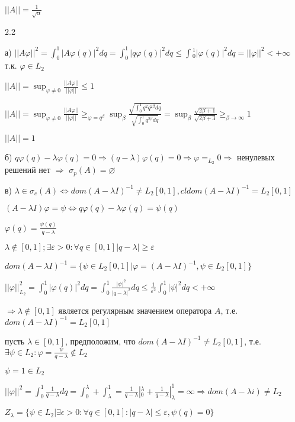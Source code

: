 \documentclass[russian]{article}
\begin{document}
$ ||A|| = \frac{1}{\sqrt{\alpha}} $

2.2

а) $ ||A\varphi||^2=\int_0^1|A\varphi(q)|^2dq=\int_{0}^{1}|q\varphi(q)|^2dq \le \int{}_{0}^{1}|\varphi (q)|^2dq =|| \varphi ||^2<+\infty$ т.к. $\varphi \in L_2 $

$ ||A|| = \sup _{\varphi \ne 0 } \frac{||A\varphi||}{||\varphi||} \le 1 $ 

$ ||A|| = \sup _{\varphi \ne 0 } \frac{||A\varphi||}{||\varphi||} \ge _{\varphi=q^\beta} \sup_\beta \frac{\sqrt{\int_0^1q^2q^{2\beta}dq}}{\sqrt{\int_0^1q^{2\beta}dq}} = \sup _\beta \frac{\sqrt{2\beta + 1}}{\sqrt{2\beta+3}} \ge _{\beta \rightarrow \infty} 1$

$ ||A|| = 1 $

б) $q\varphi(q)-\lambda\varphi(q)=0\Rightarrow(q-\lambda)\varphi(q)=0\Rightarrow\varphi=_{L_{2}}0 \Rightarrow $ ненулевых решений нет $\Rightarrow$ $\sigma_{p}(A)=\varnothing$

в) $ \lambda \in \sigma_c(A) \Leftrightarrow dom (A - \lambda I)^{-1} \ne L_2[0,1], cl dom (A - \lambda I) ^ {-1} = L_2 [0,1]$

$(A-\lambda I)\varphi=\psi\Leftrightarrow q\varphi(q)-\lambda\varphi(q)=\psi(q)$

$\varphi(q)=\frac{\psi(q)}{q-\lambda}$

$ \lambda \notin [0, 1]; \exists \varepsilon > 0 : \forall q \in [0,1] |q-\lambda|\ge \varepsilon $

$ dom(A-\lambda I)^{-1}=\{\psi\in L_2[0,1]|\varphi=(A-\lambda I)^{-1},\psi \in L_2[0,1]\}$

$ ||\varphi||^2_{L_2} = \int_0^1|\varphi(q)|^2dq=\int_0^1\frac{|\psi|^2}{|q-\lambda|^2}dq \le \frac{1}{\varepsilon^2}\int_0^1|\psi|^2dq < +\infty$

$ \Rightarrow \lambda \notin [0,1] $ является регулярным значением оператора $A$, т.е. $dom(A-\lambda I)^{-1}=L_2[0,1]$

пусть $ \lambda \in [0,1]$, предположим, что $dom(A-\lambda I)^{-1}\ne L_2[0,1]$, т.е. $\exists \psi \in L_2 : \varphi = \frac{\psi}{q-\lambda}\notin L_2 $

$ \psi = 1 \in L_2 $

$ ||\varphi||^2 = \int _0^1 \frac{1}{q-\lambda}dq = \int_0^\lambda + \int_\lambda^1 = \frac{1}{q-\lambda}|_0^\lambda+\frac{1}{q-\lambda}|_\lambda^1=\infty \Rightarrow dom(A-\lambda i) \ne L_2 $

$ Z_\lambda = \{\psi \in L_2 | \exists \epsilon > 0 : \forall q \in [0,1] : |q - \lambda|\le \varepsilon, \psi(q) = 0\} $
\end{document}
